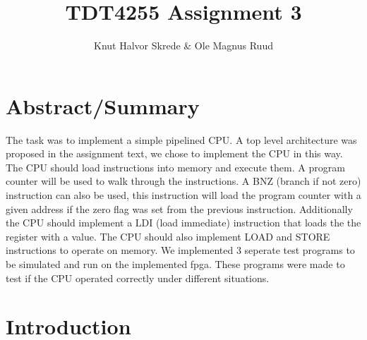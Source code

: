 \documentclass[11pt]{report}
\title{TDT4255 Assignment 3}
\author{Knut Halvor Skrede \& Ole Magnus Ruud}
\begin{document}
\maketitle
\clearpage


\section*{Abstract/Summary}
        

The task was to implement a simple pipelined CPU. A top level architecture 
was proposed in the assignment text, we chose to implement the CPU in this way. 
The CPU should load instructions into memory and execute them. 
A program counter will be used to walk through the 
instructions. A BNZ (branch if not zero) instruction can also be used, this 
instruction will load the program counter with a given address if the zero flag
was set from the previous instruction. Additionally the CPU should implement a 
LDI (load immediate) instruction that loads the the register with a value. 
The CPU should also implement LOAD and STORE instructions to operate on memory.
We implemented 3 seperate test programs to be simulated and run on the implemented
fpga. These programs were made to test if the CPU operated correctly under different
situations.

\section*{Introduction}

\end{document}
